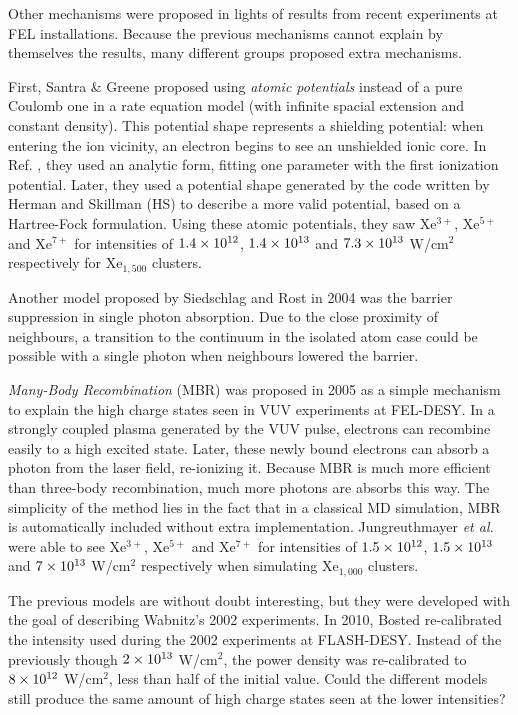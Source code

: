 Other mechanisms were proposed in lights of results from recent experiments at
FEL installations. Because the previous mechanisms cannot explain by themselves
the results, many different groups proposed extra mechanisms.


First, Santra \& Greene proposed using \textit{atomic potentials} instead of a
pure Coulomb one in a rate equation model (with infinite spacial extension and
constant density). This potential shape represents a shielding potential: when
entering the ion vicinity, an electron begins to see an unshielded ionic core.
In Ref. \cite{Greene2003}, they used an analytic form, fitting one parameter
with the first ionization potential. Later\cite{Walters2006}, they used a
potential shape generated by the code written by Herman and
Skillman\cite{HS1963} (HS) to describe a more valid potential, based on a
Hartree-Fock formulation. Using these atomic potentials, they saw Xe$^{3+}$,
Xe$^{5+}$ and Xe$^{7+}$ for intensities of $\ten{1.4}{12}$, $\ten{1.4}{13}$ and
$\ten{7.3}{13}$ W/cm$^2$ respectively for Xe$_{1,500}$ clusters.

Another model proposed by Siedschlag and Rost\cite{Siedschlag2004} in 2004 was
the barrier suppression in single photon absorption. Due to the close proximity
of neighbours, a transition to the continuum in the isolated atom case could be
possible with a single photon when neighbours lowered the barrier.

\textit{Many-Body Recombination} (MBR) was proposed in 2005
as a simple mechanism to explain the high charge states seen in VUV
experiments at FEL-DESY\cite{Jungreuthmayer2005}. In a strongly coupled plasma
generated by the VUV pulse, electrons can recombine easily to a high excited
state. Later, these newly bound electrons can absorb a photon from the laser
field, re-ionizing it. Because MBR is much more efficient than three-body
recombination, much more photons are absorbs this way. The simplicity of the
method lies in the fact that in a classical MD simulation, MBR is automatically
included without extra implementation. Jungreuthmayer \textit{et al.} were able
to see Xe$^{3+}$, Xe$^{5+}$ and Xe$^{7+}$ for intensities of $\ten{1.5}{12}$,
$\ten{1.5}{13}$ and $\ten{7}{13}$ W/cm$^2$ respectively when simulating
Xe$_{1,000}$ clusters.


The previous models are without doubt interesting, but they were developed with
the goal of describing Wabnitz's 2002 experiments. In 2010, Bosted
re-calibrated the intensity used during the 2002 experiments at FLASH-DESY.
Instead of the previously though $\ten{2}{13}$ W/cm$^2$, the power density was
re-calibrated to $\ten{8}{12}$ W/cm$^2$, less than half of the initial value.
Could the different models still produce the same amount of high charge states
seen at the lower intensities?

